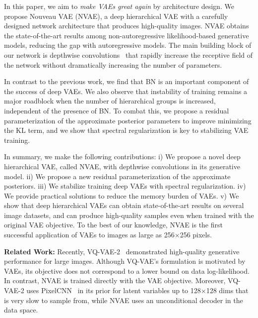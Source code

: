 \documentclass{article}
\begin{document}
In this paper, we aim to \textit{make VAEs great again} by architecture design. We propose Nouveau VAE (NVAE), a deep hierarchical VAE with a carefully designed network architecture that produces high-quality images. NVAE obtains the state-of-the-art results among non-autoregressive likelihood-based generative models, reducing the gap with autoregressive models. The main building block of our network is depthwise convolutions~\cite{vanhoucke2014depth, chollet2017xception} that rapidly increase the receptive field of the network without dramatically increasing the number of parameters. 

In contrast to the previous work, we find that BN is an important component of the success of deep VAEs. We also observe that instability of training remains a major roadblock when the number of hierarchical groups is increased, independent of the presence of BN. To combat this, we propose a residual parameterization of the approximate posterior parameters to improve minimizing the KL term, and we show that spectral regularization is key to stabilizing VAE training. 


In summary, we make the following contributions: i) We propose a novel deep hierarchical VAE, called NVAE, with depthwise convolutions in its generative model. ii) We propose a new residual parameterization of the approximate posteriors. iii) We stabilize training deep VAEs with spectral regularization. iv) We provide practical solutions to reduce the memory burden of VAEs. v) We show that deep hierarchical VAEs can obtain state-of-the-art results on several image datasets, and can produce high-quality samples even when trained with the original VAE objective. To the best of our knowledge, NVAE is the first successful application of VAEs to images as large as 256$\times$256 pixels.

\textbf{Related Work:} Recently, VQ-VAE-2~\cite{razavi2019generating} demonstrated high-quality generative performance for large images. Although VQ-VAE's formulation is motivated by VAEs, its objective does not correspond to a lower bound on data log-likelihood. In contrast, NVAE is trained directly with the VAE objective. Moreover, VQ-VAE-2 uses PixelCNN~\cite{van2016pixel} in its prior for latent variables up to 128$\times$128 dims that is very slow to sample from, while NVAE uses an unconditional decoder in the data space. 
\end{document}
